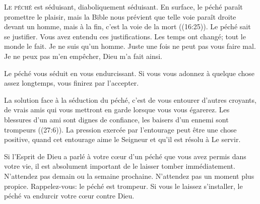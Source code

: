 \dvrule






\lettrine{L}{e péché} est séduisant, diaboliquement séduisant.
 En surface, le péché paraît promettre le plaisir,
 mais la Bible nous prévient que \Og telle 
 voie paraît droite devant un homme, mais à la fin,
 c'est la voie de la mort \Fg{} ((16:25)).
 Le péché sait se justifier. Vous avez entendu ces justifications.
 \Og Les temps ont changé; tout le monde le fait. \Fg{}
 \Og Je ne suis qu'un homme. \Fg{}
 \Og Juste une fois ne peut pas vous faire mal. \Fg{}
 \Og Je ne peux pas m'en empêcher, Dieu m'a fait ainsi. \Fg{}


Le péché vous séduit en vous endurcissant.
 Si vous vous adonnez à quelque chose assez longtemps,
 vous finirez par l'accepter. 

La solution face à la séduction du péché, c'est de vous entourer
 d'autres croyants, de vrais amis qui vous mettront en garde
 lorsque vous vous égarerez.
 \Og Les blessures d'un ami sont dignes de confiance,
 les baisers d'un ennemi sont trompeurs \Fg{} ((27:6)).
 La pression exercée par l'entourage peut être une chose positive,
 quand cet entourage aime le Seigneur et qu'il est résolu à Le servir. 

Si l'Esprit de Dieu a parlé à votre c\oe{}ur d'un péché que vous avez permis
 dans votre vie, il est absolument important de le laisser tomber
 immédiatement.
 N'attendez pas demain ou la semaine prochaine.
 N'attendez pas un moment plus propice. Rappelez-vous:
 le péché est trompeur.
 Si vous le laissez s'installer,
 le péché va endurcir votre c\oe{}ur contre Dieu. 

\dvrule



